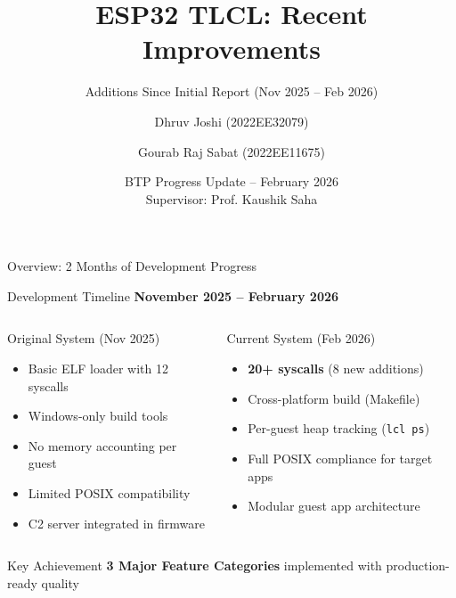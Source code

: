 \documentclass[aspectratio=169, 10pt]{beamer}
\title[TLCL: Recent Improvements]{ESP32 TLCL: Recent Improvements}
\subtitle{Additions Since Initial Report (Nov 2025 -- Feb 2026)}
\author[Joshi \& Sabat]{Dhruv Joshi (2022EE32079) \and Gourab Raj Sabat (2022EE11675)}
\institute[IIT Delhi]{Department of Electrical Engineering \\ Indian Institute of Technology Delhi}
\date{BTP Progress Update -- February 2026 \\ Supervisor: Prof. Kaushik Saha}
\begin{document}
\begin{frame}
\titlepage
\end{frame}

\begin{frame}{Overview: 2 Months of Development Progress}
    \begin{block}{Development Timeline}
        \centering
        \textbf{November 2025 -- February 2026}
    \end{block}

    \vspace{0.3cm}
    \begin{columns}[T]
        \begin{alertblock}{Original System (Nov 2025)}
            \begin{itemize}\setlength{\itemsep}{2pt}
                \item Basic ELF loader with 12 syscalls
                \item Windows-only build tools
                \item No memory accounting per guest
                \item Limited POSIX compatibility
                \item C2 server integrated in firmware
            \end{itemize}
        \end{alertblock}

        \begin{exampleblock}{Current System (Feb 2026)}
            \begin{itemize}\setlength{\itemsep}{2pt}
                \item \textbf{20+ syscalls} (8 new additions)
                \item Cross-platform build (Makefile)
                \item Per-guest heap tracking (\texttt{lcl ps})
                \item Full POSIX compliance for target apps
                \item Modular guest app architecture
            \end{itemize}
        \end{exampleblock}
    \end{columns}

    \vspace{0.3cm}
    \begin{alertblock}{Key Achievement}
        \centering
        \textbf{3 Major Feature Categories} implemented with production-ready quality
    \end{alertblock}
\end{frame}
\end{document}
